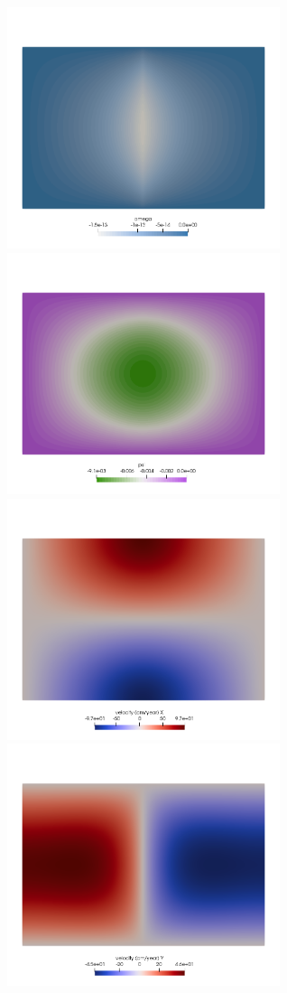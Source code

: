 \begin{center}
\includegraphics[width=8cm]{python_codes/fieldstone_153/results/exp2/omega}
\includegraphics[width=8cm]{python_codes/fieldstone_153/results/exp2/psi}\\
\includegraphics[width=8cm]{python_codes/fieldstone_153/results/exp2/u}
\includegraphics[width=8cm]{python_codes/fieldstone_153/results/exp2/v}\\

\end{center}

